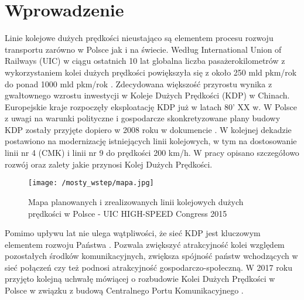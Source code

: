 
\chapter*{Wprowadzenie}

Linie kolejowe dużych prędkości nieustająco są elementem procesu rozwoju transportu zarówno w Polsce jak i na świecie. Według International Union of Railways (UIC) w ciągu ostatnich 10 lat globalna liczba pasażerokilometrów z wykorzystaniem kolei dużych prędkości powiększyła się z około 250 mld pkm/rok do ponad 1000 mld pkm/rok \parencite{UIC2021}. Zdecydowana większość przyrostu wynika z gwałtownego wzrostu inwestycji w Koleje Dużych Prędkości (KDP) w Chinach. Europejskie kraje rozpoczęły eksploatację KDP już w latach 80' XX w. W Polsce z uwagi na warunki polityczne i gospodarcze skonkretyzowane plany budowy KDP zostały przyjęte dopiero w 2008 roku w dokumencie \parencite{UchwaaNr276}. W kolejnej dekadzie postawiono na modernizację istniejących linii kolejowych, w tym na dostosowanie linii nr 4 (CMK) i linii nr 9 do prędkości 200 km/h. W pracy \parencite{Towpik2010} opisano szczegółowo rozwój oraz zalety jakie przynosi Kolej Dużych Prędkości. 

\begin{figure}[hbt!]
	\centering
	\texttt{[image: /mosty\_wstep/mapa.jpg]}
	\captionsetup{justification=centering}
	\caption{Mapa planowanych i zrealizowanych linii kolejowych dużych prędkości w Polsce - UIC HIGH-SPEED Congress 2015 \parencite{UIC2015}}
	\label{fig:LDP_mapa}
\end{figure}

Pomimo upływu lat nie ulega wątpliwości, że sieć KDP jest kluczowym elementem rozwoju Państwa \parencite{Raczynski2010}. Pozwala zwiększyć atrakcyjność kolei względem pozostałych środków komunikacyjnych, zwiększa spójność państw wchodzących w sieć połączeń czy też podnosi atrakcyjność gospodarczo-społeczną. W 2017 roku przyjęto kolejną uchwałę mówiącej o rozbudowie Kolei Dużych Prędkości w Polsce w związku z budową Centralnego Portu Komunikacyjnego \parencite{UchwaaNr173}. 


